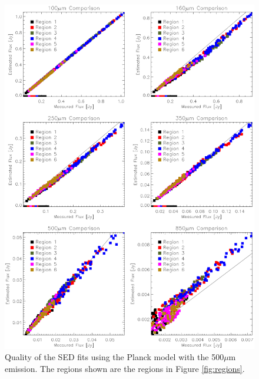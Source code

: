 \begin{figure}
  \centering
  \includegraphics[width=1.\textwidth]{sed_imgs/flux_compare_1_5.eps}
  \caption[Planck Model SED Fit Quality Using 500$\mu$m Data]{Quality of the SED fits using the Planck model with the 500$\mu$m emission.  The regions shown are the regions in Figure \ref{fig:regions}.}
  \label{fig:w1_5}
\end{figure}

